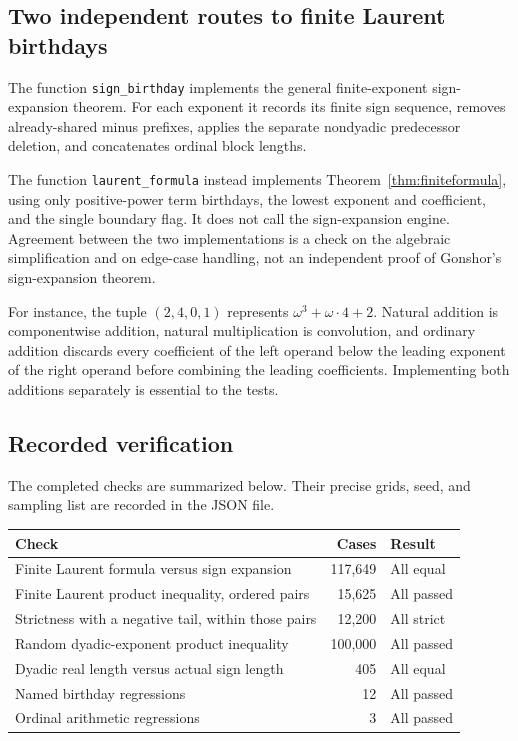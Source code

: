 \documentclass[11pt,letterpaper]{article}
\numberwithin{equation}{section}
\theoremstyle{definition}
\theoremstyle{remark}
\newcommand{\co}[1]{\texttt{#1}}
\begin{document}
\subsection{Two independent routes to finite Laurent birthdays}
The function \co{sign\_birthday} implements the general finite-exponent
sign-expansion theorem. For each exponent it records its finite sign sequence,
removes already-shared minus prefixes, applies the separate nondyadic
predecessor deletion, and concatenates ordinal block lengths.

The function \co{laurent\_formula} instead implements
Theorem~\ref{thm:finiteformula}, using only positive-power term birthdays, the
lowest exponent and coefficient, and the single boundary flag. It does not call
the sign-expansion engine. Agreement between the two implementations is a
check on the algebraic simplification and on edge-case handling, not an
independent proof of Gonshor's sign-expansion theorem.

For instance, the tuple $(2,4,0,1)$ represents
$\omega^3+\omega\cdot4+2$. Natural addition is componentwise addition, natural
multiplication is convolution, and ordinary addition discards every coefficient
of the left operand below the leading exponent of the right operand before
combining the leading coefficients. Implementing both additions separately
is essential to the tests.

\subsection{Recorded verification}
The completed checks are summarized below. Their precise grids, seed, and
sampling list are recorded in the JSON file.

\begin{center}
\renewcommand{\arraystretch}{1.22}
\begin{tabular}{@{}p{}r p{}@{}}
\toprule
Check & Cases & Result\\
\midrule
Finite Laurent formula versus sign expansion & 117,649 & All equal\\
Finite Laurent product inequality, ordered pairs & 15,625 & All passed\\
Strictness with a negative tail, within those pairs & 12,200 & All strict\\
Random dyadic-exponent product inequality & 100,000 & All passed\\
Dyadic real length versus actual sign length & 405 & All equal\\
Named birthday regressions & 12 & All passed\\
Ordinal arithmetic regressions & 3 & All passed\\
\bottomrule
\end{tabular}
\end{center}
\end{document}
